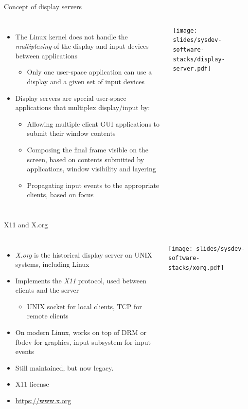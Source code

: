 \begin{frame}{Concept of display servers}
  \begin{columns}
    \begin{itemize}
    \item The Linux kernel does not handle the {\em multiplexing} of the
      display and input devices between applications
      \begin{itemize}
      \item Only one user-space application can use a display and a
        given set of input devices
      \end{itemize}
    \item Display servers are special user-space applications that
      multiplex display/input by:
      \begin{itemize}
      \item Allowing multiple client GUI applications to submit their
        window contents
      \item Composing the final frame visible on the screen, based on
        contents submitted by applications, window visibility and
        layering
      \item Propagating input events to the appropriate clients, based
        on focus
      \end{itemize}
    \end{itemize}
    \texttt{[image: slides/sysdev-software-stacks/display-server.pdf]}
  \end{columns}
\end{frame}

\begin{frame}{X11 and X.org}
  \begin{columns}[T]
    \begin{itemize}
    \item {\em X.org} is the historical display server on UNIX
      systems, including Linux
    \item Implements the {\em X11} protocol, used between clients and
      the server
      \begin{itemize}
      \item UNIX socket for local clients, TCP for remote clients
      \end{itemize}
    \item On modern Linux, works on top of DRM or fbdev for graphics,
      input subsystem for input events
    \item Still maintained, but now legacy.
    \item X11 license
    \item \url{https://www.x.org}
    \end{itemize}
    \texttt{[image: slides/sysdev-software-stacks/xorg.pdf]}
  \end{columns}
\end{frame}


